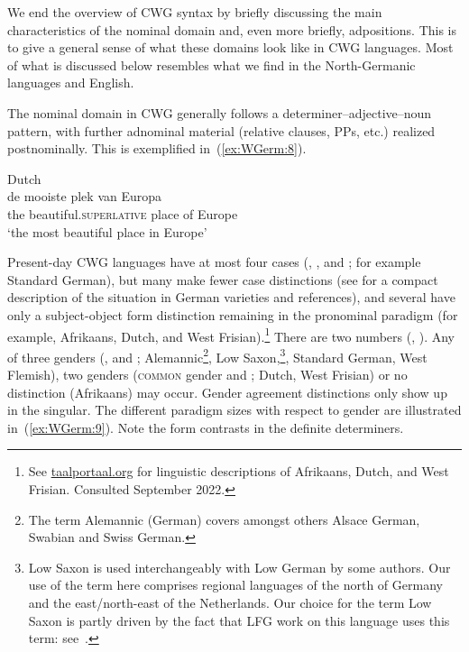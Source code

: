 \documentclass[output=paper,hidelinks]{langscibook}
\begin{document}
We end the overview of CWG syntax by briefly discussing the main
characteristics of the nominal domain and, even more briefly,
adpositions. This is to give a general sense of what these domains
look like in CWG languages. Most of what is discussed below resembles
what we find in the North-Germanic languages and English.

The nominal domain in CWG generally follows a
determiner--adjective--noun pattern, with further adnominal material
(relative clauses, PPs, etc.) realized postnominally. This is exemplified
in~(\ref{ex:WGerm:8}).
%
\begin{exe}
  \ex  Dutch\label{ex:WGerm:8}\\{\gll de mooiste plek van Europa\\
    the beautiful.\textsc{superlative} place of Europe\\
    \glt `the most beautiful place in Europe'}
\end{exe}
%
Present-day CWG languages have at most four cases (\NOM, \GEN, \DAT
and \ACC; for example Standard German), but many make fewer case distinctions (see \citealp{kasper:2014} for a compact description of the situation in German varieties and references), and  several have only a subject-object form distinction
remaining in the pronominal paradigm (for example, Afrikaans, Dutch, and West Frisian).\footnote{See \url{taalportaal.org} for linguistic descriptions of Afrikaans, Dutch, and West Frisian. Consulted September 2022.} There are two numbers (\SG, \PL). Any of three genders
(\M, \F and \N; Alemannic\footnote{The term
Alemannic (German) covers amongst others Alsace German, Swabian and Swiss German.}, Low Saxon,\footnote{Low
Saxon is used interchangeably with Low German by some authors. Our use
of the term here comprises regional languages of the north of Germany
and the east/north-east of the Netherlands. Our choice for the term
Low Saxon is partly driven by the fact that LFG work on this language
uses this term: see~.}, Standard German, West Flemish), two
genders (\textsc{common} gender and \N; Dutch, West Frisian) or no distinction
(Afrikaans) may occur. Gender agreement distinctions only show up in the
singular. The different paradigm sizes with respect to gender are
illustrated in~(\ref{ex:WGerm:9}). Note the form contrasts in the definite
determiners.
%
\end{document}
